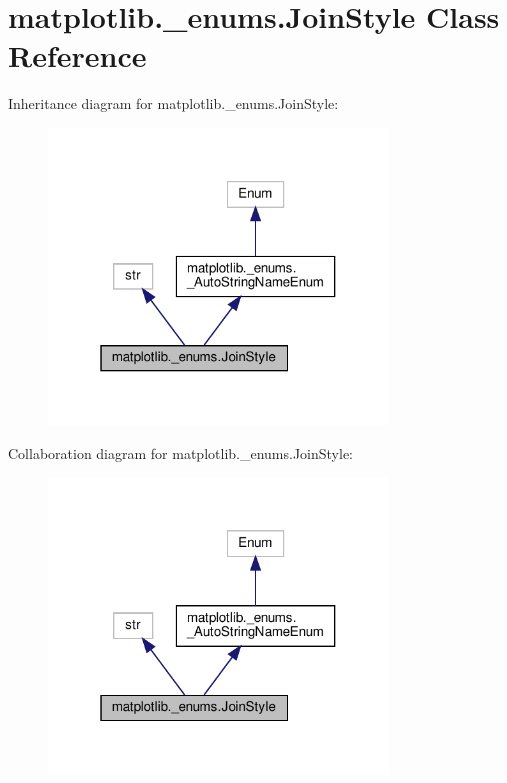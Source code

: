 \hypertarget{classmatplotlib_1_1__enums_1_1JoinStyle}{}\section{matplotlib.\+\_\+enums.\+Join\+Style Class Reference}
\label{classmatplotlib_1_1__enums_1_1JoinStyle}


Inheritance diagram for matplotlib.\+\_\+enums.\+Join\+Style\+:
\nopagebreak
\begin{figure}[H]
\begin{center}
\leavevmode
\includegraphics[width=256pt]{classmatplotlib_1_1__enums_1_1JoinStyle__inherit__graph}
\end{center}
\end{figure}


Collaboration diagram for matplotlib.\+\_\+enums.\+Join\+Style\+:
\nopagebreak
\begin{figure}[H]
\begin{center}
\leavevmode
\includegraphics[width=256pt]{classmatplotlib_1_1__enums_1_1JoinStyle__coll__graph}
\end{center}
\end{figure}
